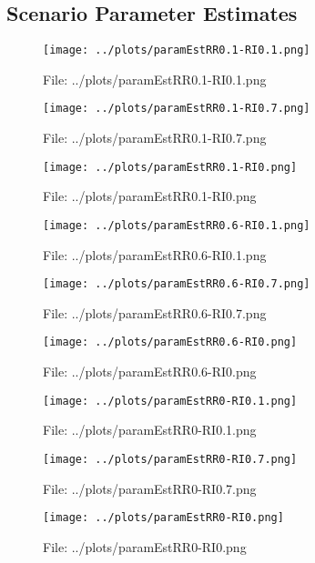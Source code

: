 \documentclass[a4paper, 11pt]{report}
\let\Oldsubsection\subsection
\renewcommand{\subsection}{\FloatBarrier\Oldsubsection}
\begin{document}
\subsection{Scenario Parameter Estimates}
\begin{figure}[h!] \caption{File: ../plots/paramEstRR0.1-RI0.1.png} \texttt{[image: ../plots/paramEstRR0.1-RI0.1.png]} \end{figure}
\begin{figure}[h!] \caption{File: ../plots/paramEstRR0.1-RI0.7.png} \texttt{[image: ../plots/paramEstRR0.1-RI0.7.png]} \end{figure}
\begin{figure}[h!] \caption{File: ../plots/paramEstRR0.1-RI0.png} \texttt{[image: ../plots/paramEstRR0.1-RI0.png]} \end{figure}
\begin{figure}[h!] \caption{File: ../plots/paramEstRR0.6-RI0.1.png} \texttt{[image: ../plots/paramEstRR0.6-RI0.1.png]} \end{figure}
\begin{figure}[h!] \caption{File: ../plots/paramEstRR0.6-RI0.7.png} \texttt{[image: ../plots/paramEstRR0.6-RI0.7.png]} \end{figure}
\begin{figure}[h!] \caption{File: ../plots/paramEstRR0.6-RI0.png} \texttt{[image: ../plots/paramEstRR0.6-RI0.png]} \end{figure}
\begin{figure}[h!] \caption{File: ../plots/paramEstRR0-RI0.1.png} \texttt{[image: ../plots/paramEstRR0-RI0.1.png]} \end{figure}
\begin{figure}[h!] \caption{File: ../plots/paramEstRR0-RI0.7.png} \texttt{[image: ../plots/paramEstRR0-RI0.7.png]} \end{figure}
\begin{figure}[h!] \caption{File: ../plots/paramEstRR0-RI0.png} \texttt{[image: ../plots/paramEstRR0-RI0.png]} \end{figure}
\end{document}
